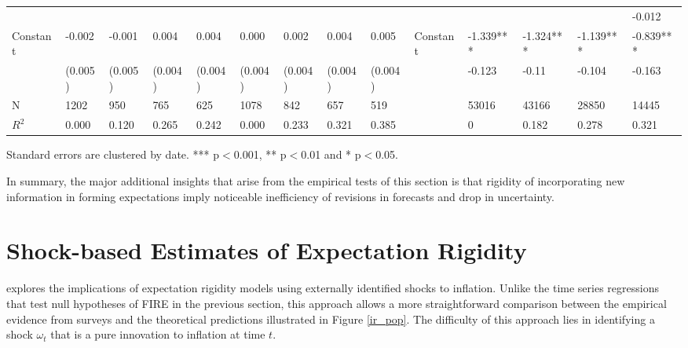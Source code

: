 \documentclass[12pt]{article}
\begin{document}
\begin{table}
\begin{adjustbox}{width={24cm},totalheight={14cm}}
\begin{threeparttable}
\begin{tabular}{llllllllllllll}
					&             &           &           &           &               &           &           &           &                      &               &           &           & -0.012    \\
					Constant               & -0.002      & -0.001    & 0.004     & 0.004     & 0.000         & 0.002     & 0.004     & 0.005     &   Constant                   & -1.339***     & -1.324*** & -1.139*** & -0.839*** \\
					& (0.005)     & (0.005)   & (0.004)   & (0.004)   & (0.004)       & (0.004)   & (0.004)   & (0.004)   &                      & -0.123        & -0.11     & -0.104    & -0.163    \\
					\hline 
					N                    & 1202        & 950       & 765       & 625       & 1078          & 842       & 657       & 519       &                      & 53016         & 43166     & 28850     & 14445     \\
					$R^2$ & 0.000       & 0.120     & 0.265     & 0.242     & 0.000         & 0.233     & 0.321     & 0.385     &                      & 0             & 0.182     & 0.278     & 0.321  \\
					\hline    
				\end{tabular}
				\begin{tablenotes}
					\item Standard errors are clustered by date. *** p$<$0.001, ** p$<$0.01 and * p$<$0.05.
				\end{tablenotes}
			\end{threeparttable}
		\end{adjustbox}
	\end{table}

  In summary, the major additional insights that arise from the empirical tests of this section is that rigidity of incorporating new information in forming expectations imply noticeable inefficiency of revisions in forecasts and drop in uncertainty. 
  
  
	\section{Shock-based Estimates of Expectation Rigidity }\label{ShockBased}
	
	\citet{coibion2012can} explores the implications of expectation rigidity models using externally identified shocks to inflation.  Unlike the time series regressions that test null hypotheses of FIRE in the previous section, this approach allows a more straightforward comparison between the empirical evidence from surveys and the theoretical predictions illustrated in Figure \ref{ir_pop}. The difficulty of this approach lies in identifying a shock $\omega_t$ that is a pure innovation to inflation at time $t$. 
	
\end{document}
